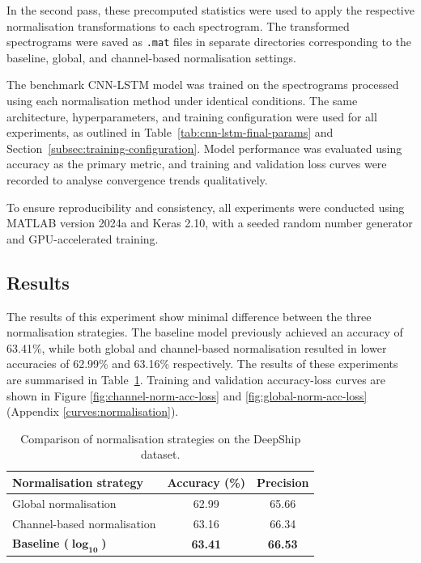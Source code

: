 In the second pass, these precomputed statistics were used to apply the respective normalisation transformations to each spectrogram. The transformed spectrograms were saved as \texttt{.mat} files in separate directories corresponding to the baseline, global, and channel-based normalisation settings.

The benchmark CNN-LSTM model was trained on the spectrograms processed using each normalisation method under identical conditions. The same architecture, hyperparameters, and training configuration were used for all experiments, as outlined in Table~\ref{tab:cnn-lstm-final-params} and Section~\ref{subsec:training-configuration}. Model performance was evaluated using accuracy as the primary metric, and training and validation loss curves were recorded to analyse convergence trends qualitatively.

To ensure reproducibility and consistency, all experiments were conducted using MATLAB version 2024a and Keras 2.10, with a seeded random number generator and GPU-accelerated training.

\subsection{Results}

The results of this experiment show minimal difference between the three normalisation strategies. The baseline model previously achieved an accuracy of 63.41\%, while both global and channel-based normalisation resulted in lower accuracies of 62.99\% and 63.16\% respectively. The results of these experiments are summarised in Table~\ref{tab:normalisation-results}. Training and validation accuracy-loss curves are shown in Figure \ref{fig:channel-norm-acc-loss} and \ref{fig:global-norm-acc-loss} (Appendix \ref{curves:normalisation}).

\begin{table}[h]
    \centering
    \caption{Comparison of normalisation strategies on the DeepShip dataset.}
    \label{tab:normalisation-results}
    \begin{tabular}{lcc}
        \toprule
        \textbf{Normalisation strategy} & \textbf{Accuracy (\%)} & \textbf{Precision} \\
        \midrule
        Global normalisation            & 62.99 & 65.66 \\
        Channel-based normalisation     & 63.16 & 66.34 \\
        \textbf{Baseline ($\bm{\log_{10}}$)}  & \textbf{63.41} & \textbf{66.53} \\
        \bottomrule
    \end{tabular}
\end{table}

